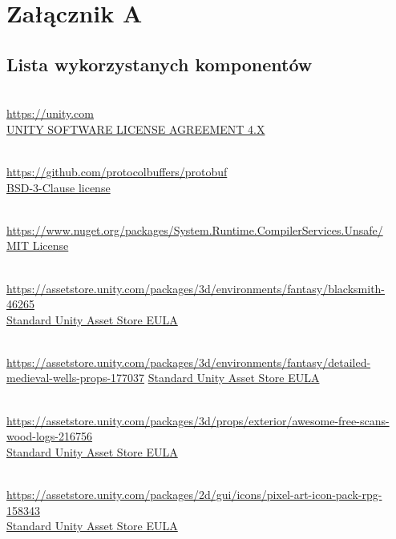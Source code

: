 \chapter*{Załącznik A}
\section*{Lista wykorzystanych komponentów}
\begin{description}[]

\item[Unity] \hfill \\ \url{https://unity.com} \\
  \href{https://unity.com/legal/eula}{UNITY SOFTWARE LICENSE AGREEMENT 4.X}

\item[Protocol Buffers] \hfill \\ \url{https://github.com/protocolbuffers/protobuf} \\
  \href{https://licenses.nuget.org/BSD-3-Clause}{BSD-3-Clause license}

\item[System.Runtime.CompilerServices.Unsafe] \hfill \\ \url{https://www.nuget.org/packages/System.Runtime.CompilerServices.Unsafe/} \\
  \href{https://licenses.nuget.org/MIT}{MIT License}

\item[Blacksmith] \hfill \\ \url{https://assetstore.unity.com/packages/3d/environments/fantasy/blacksmith-46265} \\
  \href{https://unity.com/legal/as-terms}{Standard Unity Asset Store EULA}

\item[DETAILED - Medieval Wells \& Props] \hfill \\ \url{https://assetstore.unity.com/packages/3d/environments/fantasy/detailed-medieval-wells-props-177037}
  \href{https://unity.com/legal/as-terms}{Standard Unity Asset Store EULA}

\item[Awesome Free Scans - Wood Logs] \hfill \\ \url{https://assetstore.unity.com/packages/3d/props/exterior/awesome-free-scans-wood-logs-216756} \\
  \href{https://unity.com/legal/as-terms}{Standard Unity Asset Store EULA}

\item[Pixel Art Icon Pack - RPG] \hfill \\ \url{https://assetstore.unity.com/packages/2d/gui/icons/pixel-art-icon-pack-rpg-158343} \\
  \href{https://unity.com/legal/as-terms}{Standard Unity Asset Store EULA}


\end{description}
